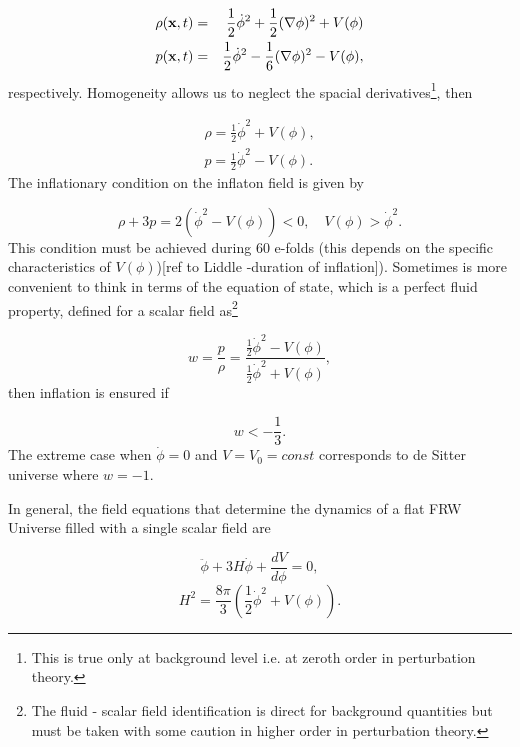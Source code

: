\documentclass[12pt,letterpaper,twoside]{book}
\newcommand\etcomment[1]{\MakeUppercase{\mytexttt{\textcolor{blue}{#1}}}}
\def\bx{{\bf x}}
\begin{document}
 \begin{eqnarray}
     \label{total:density}
     \rho(\bx,t) &=& \frac{1}{2} \dot{\phi}^2 + \frac{1}{2} (\nabla \phi )^2 + V(\phi) \\
     p(\bx,t) &=& \frac{1}{2} \dot{\phi}^2 - \frac{1}{6} (\nabla \phi )^2  - V(\phi),
     \notag
 \end{eqnarray}
 respectively. Homogeneity allows us to neglect the spacial
 derivatives\footnote{This is true only at background level i.e. at zeroth order
     in perturbation theory.}, then

 \begin{eqnarray}
     \rho=\frac{1}{2}\dot{\phi}^2+V(\phi),\\
     p=\frac{1}{2}\dot{\phi}^2-V(\phi).
 \end{eqnarray}
The inflationary condition on the inflaton field is given by

\begin{equation}
    \rho+3p=2(\dot{\phi}^2-V(\phi))<0, \quad V(\phi) > \dot{\phi}^2.
\end{equation}
 This condition must be achieved during 60 e-folds (this depends on the specific
 characteristics of $V(\phi)$)[ref to Liddle -duration of inflation]). Sometimes is
 more convenient to think in terms
 of the equation of state, which is a perfect fluid property, defined for a
 scalar field as\footnote{ The fluid - scalar field identification is direct for
     background quantities but must be taken with some caution in higher order
     in perturbation theory.}

 \begin{equation}
    w = \frac{p}{\rho}=
        \frac{\frac{1}{2}\dot{\phi}^2-V(\phi)}{\frac{1}{2}\dot{\phi}^2+V(\phi)},
 \end{equation}
then inflation is ensured if

\begin{equation}
    w < -\frac{1}{3}.
\end{equation}
The extreme case when $\dot{\phi}=0$ and $V=V_{0}=const$ corresponds to de
Sitter universe where $w=-1$.

In general, the field equations that determine the dynamics of a flat FRW Universe filled
with a single scalar field are

\begin{equation}\label{eq:field_scalar}
\ddot{\phi}+3H\dot{\phi}+\frac{dV}{d\phi}=0,
\end{equation}
\begin{equation}\label{eq:friedmann}
H^2=\frac{8\pi}{3}\left(\frac{1}{2}\dot{\phi}^2+V(\phi)\right).
\end{equation}
\etcomment{Did I change the units to $G=1$, $c=1$?, fix this}
\end{document}
